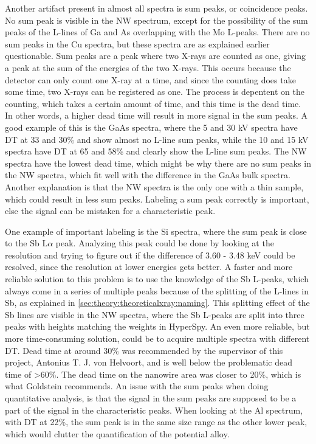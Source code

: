 Another artifact present in almost all spectra is sum peaks, or coincidence peaks.
No sum peak is visible in the NW spectrum, except for the possibility of the sum peaks of the L-lines of Ga and As overlapping with the Mo L-peaks.
There are no sum peaks in the Cu spectra, but these spectra are as explained earlier questionable.
Sum peaks are a peak where two X-rays are counted as one, giving a peak at the sum of the energies of the two X-rays.
This occurs because the detector can only count one X-ray at a time, and since the counting does take some time, two X-rays can be registered as one.
The process is depentent on the counting, which takes a certain amount of time, and this time is the dead time.
In other words, a higher dead time will result in more signal in the sum peaks.
A good example of this is the GaAs spectra, where the 5 and 30 kV spectra have DT at 33 and 30\% and show almost no L-line sum peaks, while the 10 and 15 kV spectra have DT at 65 and 58\% and clearly show the L-line sum peaks.
The NW spectra have the lowest dead time, which might be why there are no sum peaks in the NW spectra, which fit well with the difference in the GaAs bulk spectra.
Another explanation is that the NW spectra is the only one with a thin sample, which could result in less sum peaks.
Labeling a sum peak correctly is important, else the signal can be mistaken for a characteristic peak.

One example of important labeling is the Si spectra, where the sum peak is close to the Sb L$\alpha$ peak.
Analyzing this peak could be done by looking at the resolution and trying to figure out if the difference of 3.60 - 3.48 keV could be resolved, since the resolution at lower energies gets better.
A faster and more reliable solution to this problem is to use the knowledge of the Sb L-peaks, which always come in a series of multiple peaks because of the splitting of the L-lines in Sb, as explained in \cref{sec:theory:theoreticalxray:naming}.
This splitting effect of the Sb lines are visible in the NW spectra, where the Sb L-peaks are split into three peaks with heights matching the weights in HyperSpy.
An even more reliable, but more time-consuming solution, could be to acquire multiple spectra with different DT.
Dead time at around 30\% was recommended by the supervisor of this project, Antonius T. J. von Helvoort, and is well below the problematic dead time of >60\%.
The dead time on the nanowire area was closer to 20\%, which is what Goldstein \cite[page 223]{goldstein_scanning_2018} recommends.
An issue with the sum peaks when doing quantitative analysis, is that the signal in the sum peaks are supposed to be a part of the signal in the characteristic peaks.
When looking at the Al spectrum, with DT at 22\%, the sum peak is in the same size range as the other lower peak, which would clutter the quantification of the potential alloy.


